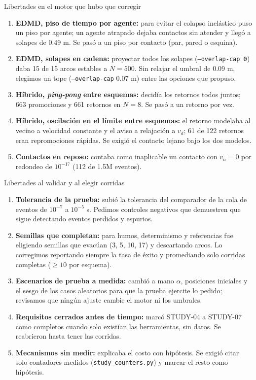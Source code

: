 \begin{frame}{Libertades en el motor que hubo que corregir}
  \footnotesize
  \begin{enumerate}
    \item \textbf{EDMD, piso de tiempo por agente:} para evitar el colapso inelástico puso un
      piso por agente; un agente atrapado dejaba contactos sin atender y llegó a solapes de
      0.49 m. Se pasó a un piso por contacto (par, pared o esquina).
    \item \textbf{EDMD, solapes en cadena:} proyectar todos los solapes (\texttt{--overlap-cap 0})
      daba 15 de 15 arcos estables a $N = 500$. Sin relajar el umbral de 0.09 m, elegimos un
      tope (\texttt{--overlap-cap} 0.07 m) entre las opciones que propuso.
    \item \textbf{Híbrido, \emph{ping-pong} entre esquemas:} decidía los retornos todos juntos;
      663 promociones y 661 retornos en $N = 8$. Se pasó a un retorno por vez.
    \item \textbf{Híbrido, oscilación en el límite entre esquemas:} el retorno modelaba al vecino
      a velocidad constante y el aviso a relajación a $v_d$; 61 de 122 retornos eran
      repromociones rápidas. Se exigió el contacto lejano bajo los dos modelos.
    \item \textbf{Contactos en reposo:} contaba como inaplicable un contacto con $v_n = 0$ por
      redondeo de $10^{-17}$ (112 de 1.5M eventos).
  \end{enumerate}
\end{frame}

\begin{frame}{Libertades al validar y al elegir corridas}
  \footnotesize
  \begin{enumerate}
    \item \textbf{Tolerancia de la prueba:} subió la tolerancia del comparador de la cola de
      eventos de $10^{-7}$ a $10^{-5}$ s. Pedimos controles negativos que demuestren que sigue
      detectando eventos perdidos y espurios.
    \item \textbf{Semillas que completan:} para humos, determinismo y referencias fue eligiendo
      semillas que evacúan (3, 5, 10, 17) y descartando arcos. Lo corregimos reportando siempre
      la tasa de éxito y promediando solo corridas completas ($\geq 10$ por esquema).
    \item \textbf{Escenarios de prueba a medida:} cambió a mano $\alpha$, posiciones iniciales y
      el sesgo de los casos aleatorios para que la prueba ejercite lo pedido; revisamos que
      ningún ajuste cambie el motor ni los umbrales.
    \item \textbf{Requisitos cerrados antes de tiempo:} marcó STUDY-04 a STUDY-07 como completos
      cuando solo existían las herramientas, sin datos. Se reabrieron hasta tener las corridas.
    \item \textbf{Mecanismos sin medir:} explicaba el costo con hipótesis. Se exigió citar solo
      contadores medidos (\texttt{study\_counters.py}) y marcar el resto como hipótesis.
  \end{enumerate}
\end{frame}

